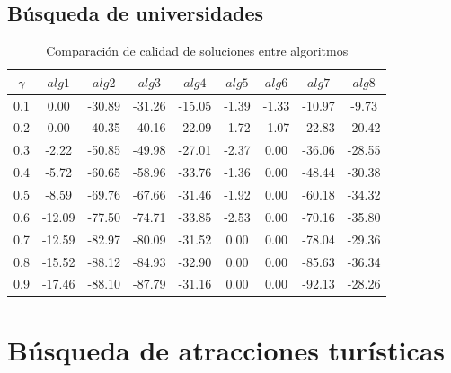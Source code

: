 \subsection{Búsqueda de universidades}
\begin{table}[H]
\begin{center}
\begin{tabular}{|c|c|c|c|c|c|c|c|c|}
\hline
$\gamma$&$alg1$&$alg2$&$alg3$&$alg4$&$alg5$&$alg6$&$alg7$&$alg8$ \\ \hline
0.1 & 0.00 & -30.89 & -31.26 & -15.05 & -1.39 & -1.33 & -10.97 & -9.73 \\
0.2 & 0.00 & -40.35 & -40.16 & -22.09 & -1.72 & -1.07 & -22.83 & -20.42 \\
0.3 & -2.22 & -50.85 & -49.98 & -27.01 & -2.37 & 0.00 & -36.06 & -28.55 \\
0.4 & -5.72 & -60.65 & -58.96 & -33.76 & -1.36 & 0.00 & -48.44 & -30.38 \\
0.5 & -8.59 & -69.76 & -67.66 & -31.46 & -1.92 & 0.00 & -60.18 & -34.32 \\
0.6 & -12.09 & -77.50 & -74.71 & -33.85 & -2.53 & 0.00 & -70.16 & -35.80 \\
0.7 & -12.59 & -82.97 & -80.09 & -31.52 & 0.00 & 0.00 & -78.04 & -29.36 \\
0.8 & -15.52 & -88.12 & -84.93 & -32.90 & 0.00 & 0.00 & -85.63 & -36.34 \\
0.9 & -17.46 & -88.10 & -87.79 & -31.16 & 0.00 & 0.00 & -92.13 & -28.26 \\
 \hline 
\end{tabular}
\caption{Comparación de calidad de soluciones entre algoritmos} 
\label{tabla:comp2}
\end{center}
\end{table}

\section{Búsqueda de atracciones turísticas}\label{res:busAtracciones}
